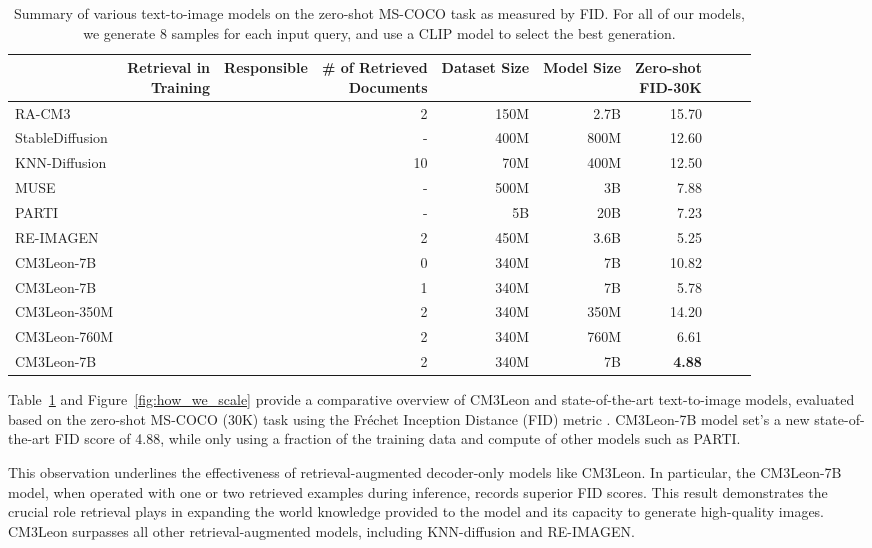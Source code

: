 \documentclass{article}
\newcommand{\cmark}{\ding{51}}
\newcommand{\xmark}{\ding{55}}
\newcommand{\model}{CM3Leon}
\begin{document}
\begin{table}[h!]
\centering\small
\begin{tabular}{@{}lrrrrrrrrr@{}}
\toprule
& \makecell{Retrieval in\\Training}  & Responsible &\makecell{\# of Retrieved\\Documents}  & Dataset Size & Model Size & \makecell{Zero-shot\\FID-30K} \\ \midrule
RA-CM3 & \cmark & \xmark & 2 & 150M & 2.7B & 15.70 \\ 
StableDiffusion & \xmark  & \xmark  & - & 400M & 800M & 12.60 \\
KNN-Diffusion & \cmark & \xmark & 10 & 70M & 400M & 12.50 \\
MUSE & \xmark & \xmark & - & 500M & 3B & 7.88 \\
PARTI & \xmark & \xmark & - & 5B & 20B & 7.23 \\
RE-IMAGEN & \cmark & \xmark  & 2 & 450M & 3.6B & 5.25 \\
\midrule
\model{}-7B   & \cmark & \cmark   & 0 & 340M & 7B & 10.82 \\ 
\model{}-7B   & \cmark & \cmark   & 1 & 340M & 7B & 5.78 \\ 
\midrule
\model{}-350M & \cmark & \cmark& 2  & 340M & 350M & 14.20 \\
\model{}-760M & \cmark & \cmark & 2 & 340M & 760M & 6.61 \\
\model{}-7B & \cmark & \cmark & 2  & 340M & 7B & \textbf{4.88} \\ \bottomrule
\end{tabular}
\caption{Summary of various text-to-image models on the zero-shot MS-COCO task as measured by FID. For all of our models, we generate 8 samples for each input query, and use a CLIP model to select the best generation.}
\label{tab:models-summary}
\end{table}


Table~\ref{tab:models-summary} and Figure~\ref{fig:how_we_scale} provide a comparative overview of CM3Leon and state-of-the-art text-to-image models, evaluated based on the zero-shot MS-COCO (30K) task using the Fréchet Inception Distance (FID) metric \citep{FID_implementation}. CM3Leon-7B model set's a new state-of-the-art FID score of 4.88, while only using a fraction of the training data and compute of other models such as PARTI.

This observation underlines the effectiveness of retrieval-augmented decoder-only models like CM3Leon. In particular, the CM3Leon-7B model, when operated with one or two retrieved examples during inference, records superior FID scores. This result demonstrates the crucial role retrieval plays in expanding the world knowledge provided to the model and its capacity to generate high-quality images. CM3Leon surpasses all other retrieval-augmented models, including KNN-diffusion and RE-IMAGEN.
\end{document}
